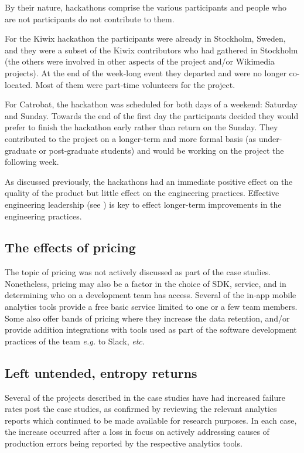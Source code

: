 By their nature, hackathons comprise the various participants and people who are not participants do not contribute to them. 

For the Kiwix hackathon the participants were already in Stockholm, Sweden, and they were a subset of the Kiwix contributors who had gathered in Stockholm (the others were involved in other aspects of the project and/or Wikimedia projects). At the end of the week-long event they departed and were no longer co-located. Most of them were part-time volunteers for the project.  

For Catrobat, the hackathon was scheduled for both days of a weekend: Saturday and Sunday. Towards the end of the first day the participants decided they would prefer to finish the hackathon early rather than return on the Sunday. They contributed to the project on a longer-term and more formal basis (as under-graduate or post-graduate students) and would be working on the project the following week.

As discussed previously, the hackathons had an immediate positive effect on the quality of the product but little effect on the engineering practices. Effective engineering leadership (see ) is key to effect longer-term improvements in the engineering practices.

\subsection{The effects of pricing}
The topic of pricing was not actively discussed as part of the case studies. Nonetheless, pricing may also be a factor in the choice of SDK, service, and in determining who on a development team has access. Several of the in-app mobile analytics tools provide a free basic service limited to one or a few team members.  Some also offer bands of pricing where they increase the data retention, and/or provide addition integrations with tools used as part of the software development practices of the team \emph{e.g.} to Slack, \emph{etc.} 

\subsection{Left untended, entropy returns}
Several of the projects described in the case studies have had increased failure rates post the case studies, as confirmed by reviewing the relevant analytics reports which continued to be made available for research purposes. In each case, the increase occurred after a loss in focus on actively addressing causes of production errors being reported by the respective analytics tools.

